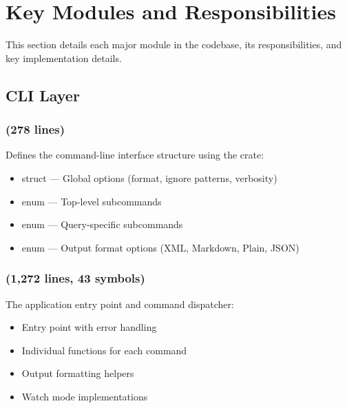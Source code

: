
\section{Key Modules and Responsibilities}
\label{sec:modules}

This section details each major module in the \ctx{} codebase, its responsibilities, and key implementation details.

\subsection{CLI Layer}

\subsubsection{ (278 lines)}

Defines the command-line interface structure using the  crate:

\begin{itemize}
    \item {} struct --- Global options (format, ignore patterns, verbosity)
    \item {} enum --- Top-level subcommands
    \item {} enum --- Query-specific subcommands
    \item {} enum --- Output format options (XML, Markdown, Plain, JSON)
\end{itemize}

\subsubsection{ (1,272 lines, 43 symbols)}

The application entry point and command dispatcher:

\begin{itemize}
    \item Entry point with error handling
    \item Individual  functions for each command
    \item Output formatting helpers
    \item Watch mode implementations
\end{itemize}


